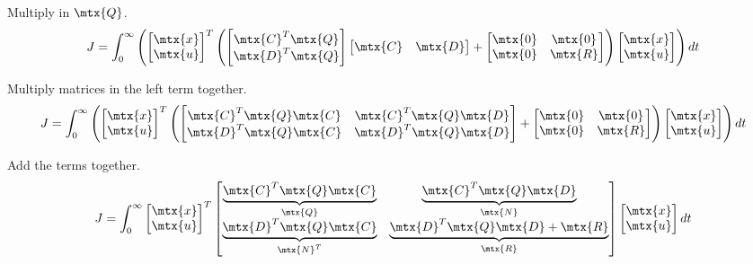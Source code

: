 Multiply in $\mtx{Q}$.
\begin{equation*}
  J = \int_0^\infty \left(
    \begin{bmatrix}
      \mtx{x} \\
      \mtx{u}
    \end{bmatrix}^T
    \left(
    \begin{bmatrix}
      \mtx{C}^T\mtx{Q} \\
      \mtx{D}^T\mtx{Q}
    \end{bmatrix}
    \begin{bmatrix}
      \mtx{C} &
      \mtx{D}
    \end{bmatrix} +
    \begin{bmatrix}
      \mtx{0} & \mtx{0} \\
      \mtx{0} & \mtx{R}
    \end{bmatrix}
    \right)
    \begin{bmatrix}
      \mtx{x} \\
      \mtx{u}
    \end{bmatrix}
    \right) dt
\end{equation*}

Multiply matrices in the left term together.
\begin{equation*}
  J = \int_0^\infty \left(
    \begin{bmatrix}
      \mtx{x} \\
      \mtx{u}
    \end{bmatrix}^T
    \left(
    \begin{bmatrix}
      \mtx{C}^T\mtx{Q}\mtx{C} & \mtx{C}^T\mtx{Q}\mtx{D} \\
      \mtx{D}^T\mtx{Q}\mtx{C} & \mtx{D}^T\mtx{Q}\mtx{D}
    \end{bmatrix} +
    \begin{bmatrix}
      \mtx{0} & \mtx{0} \\
      \mtx{0} & \mtx{R}
    \end{bmatrix}
    \right)
    \begin{bmatrix}
      \mtx{x} \\
      \mtx{u}
    \end{bmatrix}
    \right) dt
\end{equation*}

Add the terms together.
\begin{equation}
  J = \int_0^\infty
  \begin{bmatrix}
    \mtx{x} \\
    \mtx{u}
  \end{bmatrix}^T
  \begin{bmatrix}
    \underbrace{\mtx{C}^T\mtx{Q}\mtx{C}}_{\mtx{Q}} &
    \underbrace{\mtx{C}^T\mtx{Q}\mtx{D}}_{\mtx{N}} \\
    \underbrace{\mtx{D}^T\mtx{Q}\mtx{C}}_{\mtx{N}^T} &
    \underbrace{\mtx{D}^T\mtx{Q}\mtx{D} + \mtx{R}}_{\mtx{R}}
  \end{bmatrix}
  \begin{bmatrix}
    \mtx{x} \\
    \mtx{u}
  \end{bmatrix}
  dt
\end{equation}

